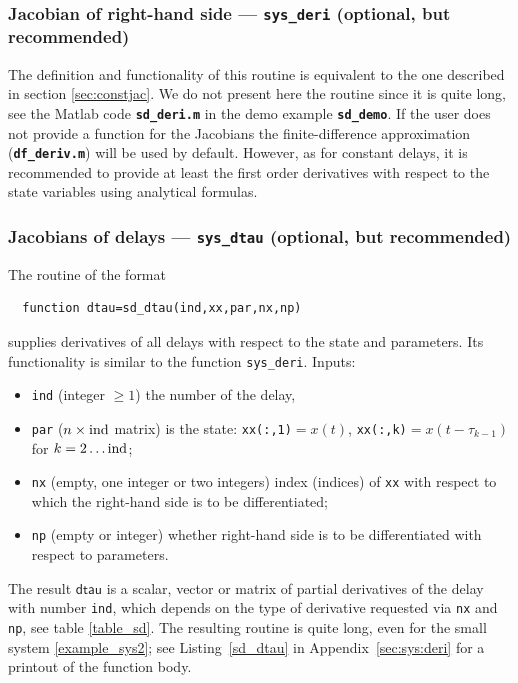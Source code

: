 \documentclass[10pt]{scrartcl}
\newcommand{\file}[1]{\textbf{\texttt{#1}}}
\newcommand{\parm}[1]{\mathsf{#1}}
\newcommand{\blist}[1]{\mbox{\lstinline!#1!}}
\begin{document}


\subsubsection{Jacobian of right-hand side --- \blist{sys_deri}
  (optional, but recommended)}
\label{sec:sdjac}
The definition and functionality of this routine is equivalent to the
one described in section \ref{sec:constjac}.  We do not present here
the routine since it is quite long, see the Matlab code
\file{sd\_deri.m} in the demo example \file{sd\_demo}. If the user does
not provide a function for the Jacobians the finite-difference
approximation (\file{df\_deriv.m}) will be used by default.  However,
as for constant delays, it is recommended to provide at least
the first order derivatives with respect to the state variables using
analytical formulas.  


\subsubsection{Jacobians of delays --- \blist{sys_dtau} (optional, but
  recommended)}
\label{sec:sddtau}
The routine of the format
\begin{lstlisting}
  function dtau=sd_dtau(ind,xx,par,nx,np)
\end{lstlisting}
supplies derivatives of all delays with respect to the state and
parameters. Its functionality is similar to the function
\blist{sys_deri}. Inputs:
\begin{itemize}
\item \blist{ind} (integer $\geq1$) the number of the delay,
\item \blist{par} ($n\times\blist{ind}$ matrix) is the state:
  \blist{xx(:,1)}$=x(t)$, \blist{xx(:,k)}$=x(t-\tau_{k-1})$ for
  $k=2\ldots\blist{ind}$;
\item \blist{nx} (empty, one integer or two integers) index (indices) of
  \blist{xx} with respect to which the right-hand side is to be
  differentiated;
\item \blist{np} (empty or integer) whether right-hand side is to be
  differentiated with respect to parameters.
\end{itemize}
The result $\parm{dtau}$ is a scalar, vector or matrix of partial
derivatives of the delay with number \blist{ind}, which depends on the
type of derivative requested via \blist{nx} and \blist{np}, see table
\ref{table_sd}. The resulting routine is quite long, even for the small system
\eqref{example_sys2}; see Listing~\ref{sd_dtau} in
Appendix~\ref{sec:sys:deri} for a printout of the function body.
\end{document}
